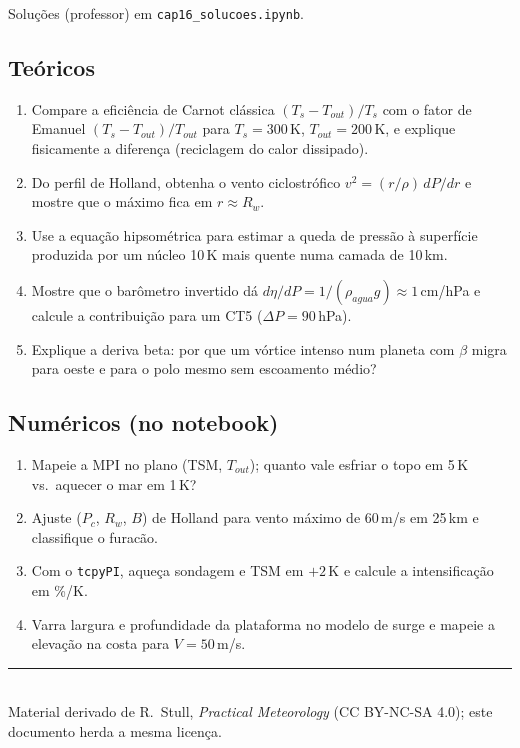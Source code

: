 \documentclass[11pt]{article}
\begin{document}
Soluções (professor) em \texttt{cap16\_solucoes.ipynb}.

\subsection*{Teóricos}

\begin{enumerate}[label=\textbf{T\arabic*.},itemsep=4pt]
  \item Compare a eficiência de Carnot clássica $(T_s-T_{out})/T_s$
        com o fator de Emanuel $(T_s-T_{out})/T_{out}$ para
        $T_s = 300$\,K, $T_{out} = 200$\,K, e explique fisicamente a
        diferença (reciclagem do calor dissipado).
  \item Do perfil de Holland, obtenha o vento ciclostrófico
        $v^2 = (r/\rho)\,dP/dr$ e mostre que o máximo fica em
        $r \approx R_w$.
  \item Use a equação hipsométrica para estimar a queda de pressão à
        superfície produzida por um núcleo 10\,K mais quente numa
        camada de 10\,km.
  \item Mostre que o barômetro invertido dá
        $d\eta/dP = 1/(\rho_{agua}g) \approx 1$\,cm/hPa e calcule a
        contribuição para um CT5 ($\Delta P = 90$\,hPa).
  \item Explique a deriva beta: por que um vórtice intenso num planeta
        com $\beta$ migra para oeste e para o polo mesmo sem
        escoamento médio?
\end{enumerate}

\subsection*{Numéricos (no notebook)}

\begin{enumerate}[label=\textbf{N\arabic*.},itemsep=4pt]
  \item Mapeie a MPI no plano (TSM, $T_{out}$); quanto vale esfriar o
        topo em 5\,K vs.\ aquecer o mar em 1\,K?
  \item Ajuste ($P_c$, $R_w$, $B$) de Holland para vento máximo de
        60\,m/s em 25\,km e classifique o furacão.
  \item Com o \texttt{tcpyPI}, aqueça sondagem e TSM em $+2$\,K e
        calcule a intensificação em \%/K.
  \item Varra largura e profundidade da plataforma no modelo de surge
        e mapeie a elevação na costa para $V = 50$\,m/s.
\end{enumerate}

\vspace{1em}
\noindent\rule{\linewidth}{0.4pt}\\
{\scriptsize Material derivado de R.~Stull, \emph{Practical Meteorology}
(CC BY-NC-SA 4.0); este documento herda a mesma licença.}
\end{document}
